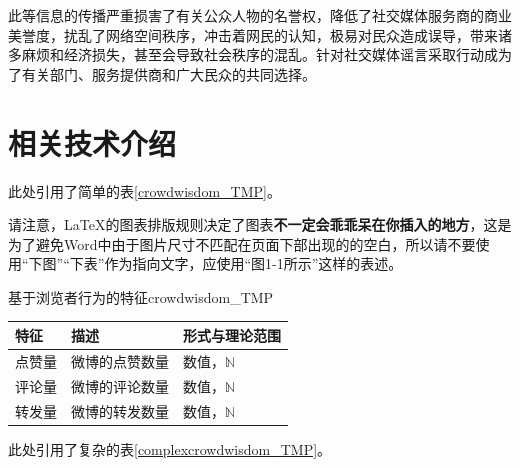 \documentclass[a4paper,AutoFakeBold,oneside,12pt]{book}
\begin{document}
此等信息的传播严重损害了有关公众人物的名誉权，降低了社交媒体服务商的商业美誉度，扰乱了网络空间秩序，冲击着网民的认知，极易对民众造成误导，带来诸多麻烦和经济损失，甚至会导致社会秩序的混乱。针对社交媒体谣言采取行动成为了有关部门、服务提供商和广大民众的共同选择。\cite{周兴2017基于深度学习的谣言检测及模式挖掘}

\section{相关技术介绍}
此处引用了简单的表\ref{crowdwisdom_TMP}。

请注意，\LaTeX{}的图表排版规则决定了图表\textbf{不一定会乖乖呆在你插入的地方}，这是为了避免Word中由于图片尺寸不匹配在页面下部出现的的空白，所以请不要使用“下图”“下表”作为指向文字，应使用“图1-1所示”这样的表述。

\begin{bupttable}{基于浏览者行为的特征}{crowdwisdom_TMP}

	\begin{tabular}{l|l|l}
		\hline \textbf{特征} & \textbf{描述}  & \textbf{形式与理论范围} \\
		\hline 点赞量        & 微博的点赞数量 & 数值，$\mathbb{N}$      \\
		\hline 评论量        & 微博的评论数量 & 数值，$\mathbb{N}$      \\
		\hline 转发量        & 微博的转发数量 & 数值，$\mathbb{N}$      \\
		\hline
	\end{tabular}
\end{bupttable}

此处引用了复杂的表\ref{complexcrowdwisdom_TMP}。
\end{document}
